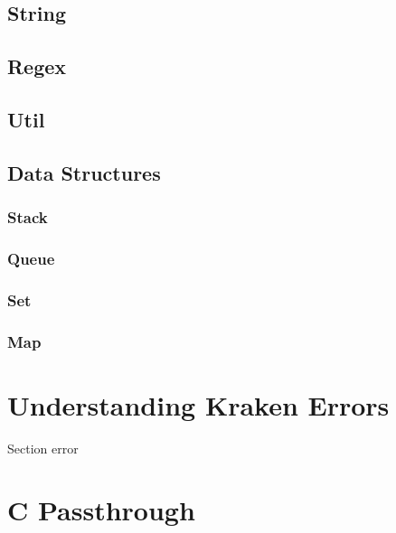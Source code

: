\documentclass{article}
\begin{document}
  \subsection{String}
  \subsection{Regex}
  \subsection{Util}
  \subsection{Data Structures}
    \subsubsection{Stack}
    \subsubsection{Queue}
    \subsubsection{Set}
    \subsubsection{Map}
\section{Understanding Kraken Errors}
  Section error
\section{C Passthrough}
\end{document}
